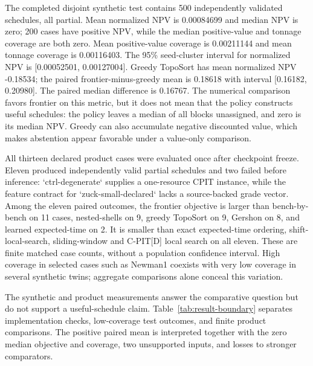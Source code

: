 \documentclass[11pt]{article}
\begin{document}
The completed disjoint synthetic test contains 500 independently validated schedules, all partial. Mean normalized NPV is 0.00084699 and median NPV is zero; 200 cases have positive NPV, while the median positive-value and tonnage coverage are both zero. Mean positive-value coverage is 0.00211144 and mean tonnage coverage is 0.00116403. The 95\% seed-cluster interval for normalized NPV is [0.00052501, 0.00127004]. Greedy TopoSort has mean normalized NPV -0.18534; the paired frontier-minus-greedy mean is 0.18618 with interval [0.16182, 0.20980]. The paired median difference is 0.16767. The numerical comparison favors frontier on this metric, but it does not mean that the policy constructs useful schedules: the policy leaves a median of all blocks unassigned, and zero is its median NPV. Greedy can also accumulate negative discounted value, which makes abstention appear favorable under a value-only comparison.

All thirteen declared product cases were evaluated once after checkpoint freeze. Eleven produced independently valid partial schedules and two failed before inference: `ctrl-degenerate` supplies a one-resource CPIT instance, while the feature contract for `zuck-small-declared` lacks a source-backed grade vector. Among the eleven paired outcomes, the frontier objective is larger than bench-by-bench on 11 cases, nested-shells on 9, greedy TopoSort on 9, Gershon on 8, and learned expected-time on 2. It is smaller than exact expected-time ordering, shift-local-search, sliding-window and C-PIT[D] local search on all eleven. These are finite matched case counts, without a population confidence interval. High coverage in selected cases such as Newman1 coexists with very low coverage in several synthetic twins; aggregate comparisons alone conceal this variation.

The synthetic and product measurements answer the comparative question but do not support a useful-schedule claim. Table~\ref{tab:result-boundary} separates implementation checks, low-coverage test outcomes, and finite product comparisons. The positive paired mean is interpreted together with the zero median objective and coverage, two unsupported inputs, and losses to stronger comparators.
\end{document}
